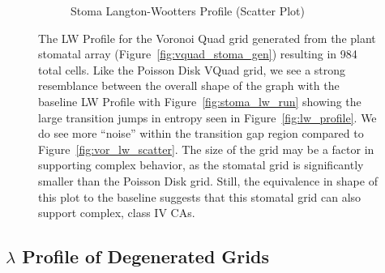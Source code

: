 \documentclass[a4paper,11pt]{article}
\begin{document}
\begin{figure}[htp]
\begin{subfigure}[t]{0.65\textwidth}
  \caption{Stoma Langton-Wootters Profile (Scatter Plot)}
  \label{fig:stoma_lw_scatter}
  \end{subfigure}
\caption[Stoma Langton-Wootters Profile]{
  The LW Profile for the Voronoi Quad grid generated from the plant stomatal array (Figure~\ref{fig:vquad_stoma_gen}) resulting in 984 total cells. Like the Poisson Disk VQuad grid, we see a strong resemblance between the overall shape of the graph with the baseline LW Profile with Figure~\ref{fig:stoma_lw_run} showing the large transition jumps in entropy seen in Figure~\ref{fig:lw_profile}. We do see more ``noise'' within the transition gap region compared to Figure~\ref{fig:vor_lw_scatter}. The size of the grid may be a factor in supporting complex behavior, as the stomatal grid is significantly smaller than the Poisson Disk grid. Still, the equivalence in shape of this plot to the baseline suggests that this stomatal grid can also support complex, class IV CAs.
}
\label{fig:stoma_lw_profile}
\end{figure}


\subsection{$\lambda$ Profile of Degenerated Grids}
\end{document}
